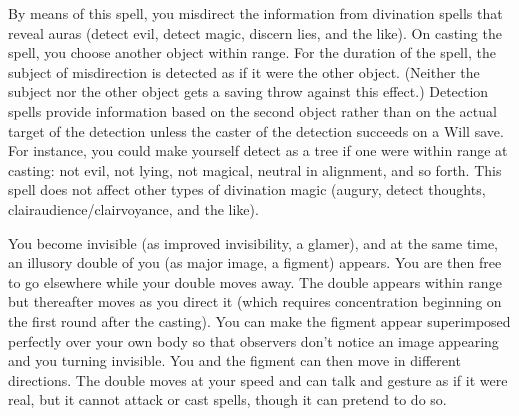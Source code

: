 \begin{multicols}{2}
\begin{small}
\noindent By means of this spell, you misdirect the information from divination spells that reveal auras (detect evil, detect magic, discern lies, and the like). On casting the spell, you choose another object within range. For the duration of the spell, the subject of misdirection is detected as if it were the other object. (Neither the subject nor the other object gets a saving throw against this effect.) Detection spells provide information based on the second object rather than on the actual target of the detection unless the caster of the detection succeeds on a Will save. For instance, you could make yourself detect as a tree if one were within range at casting: not evil, not lying, not magical, neutral in alignment, and so forth. This spell does not affect other types of divination magic (augury, detect thoughts, clairaudience/clairvoyance, and the like).

\noindent You become invisible (as improved invisibility, a glamer), and at the same time, an illusory double of you (as major image, a figment) appears. You are then free to go elsewhere while your double moves away. The double appears within range but thereafter moves as you direct it (which requires concentration beginning on the first round after the casting). You can make the figment appear superimposed perfectly over your own body so that observers don't notice an image appearing and you turning invisible. You and the figment can then move in different directions. The double moves at your speed and can talk and gesture as if it were real, but it cannot attack or cast spells, though it can pretend to do so.


\end{small}
\end{multicols}
